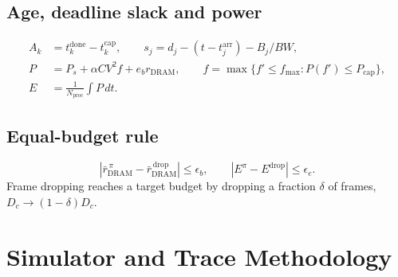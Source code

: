 \documentclass[11pt,a4paper]{article}
\begin{document}
\subsection{Age, deadline slack and power}
\begin{align}
A_k&=t^{\mathrm{done}}_k-t^{\mathrm{cap}}_k,\qquad s_j=d_j-(t-t^{\mathrm{arr}}_j)-B_j/BW,\\
P&=P_s+\alpha CV^2f+e_b r_{\mathrm{DRAM}},\qquad f=\max\{f'\le f_{\max}:P(f')\le P_{\mathrm{cap}}\},\label{eq:power}\\
E&=\frac{1}{N_{\mathrm{proc}}}\int P\,dt .
\end{align}
\subsection{Equal-budget rule}
\begin{equation}
|\bar r^{\,\pi}_{\mathrm{DRAM}}-\bar r^{\,\mathrm{drop}}_{\mathrm{DRAM}}|\le\epsilon_b,\qquad |E^{\pi}-E^{\mathrm{drop}}|\le\epsilon_e .
\end{equation}
Frame dropping reaches a target budget by dropping a fraction $\delta$ of frames, $D_c\to(1-\delta)D_c$.

\section{Simulator and Trace Methodology}\label{sec:sim}
\end{document}
